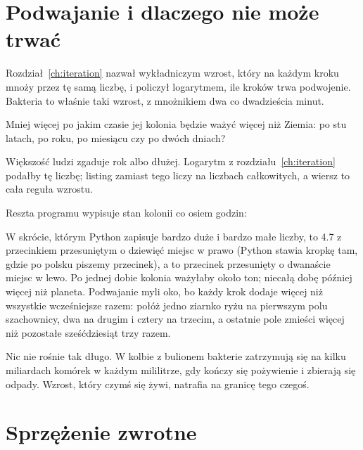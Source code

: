 \section{Podwajanie i dlaczego nie może trwać}
\label{sec:ch03-doubling}

\noindent
Rozdział~\ref{ch:iteration} nazwał wykładniczym wzrost, który na każdym
kroku mnoży przez tę samą liczbę, i policzył logarytmem, ile kroków trwa
podwojenie. Bakteria to właśnie taki wzrost, z mnożnikiem dwa co dwadzieścia
minut.

\begin{think}
Mniej więcej po jakim czasie jej kolonia będzie ważyć więcej niż Ziemia: po
stu latach, po roku, po miesiącu czy po dwóch dniach?
\end{think}
Większość ludzi zgaduje rok albo dłużej. Logarytm z
rozdziału~\ref{ch:iteration} podałby tę liczbę; listing zamiast tego liczy
na liczbach całkowitych, a wiersz  to cała reguła
wzrostu.


\noindent
Reszta programu wypisuje stan kolonii co osiem godzin:


\noindent
W skrócie, którym Python zapisuje bardzo duże i bardzo małe liczby,
 to \num{4.7} z przecinkiem przesuniętym o dziewięć miejsc w
prawo (Python stawia kropkę tam, gdzie po polsku piszemy przecinek), a
 to przecinek przesunięty o dwanaście miejsc w lewo. Po jednej
dobie kolonia ważyłaby około  ton; niecałą dobę później
więcej niż planeta. Podwajanie myli oko, bo każdy krok dodaje więcej niż
wszystkie wcześniejsze razem: połóż jedno ziarnko ryżu na pierwszym polu
szachownicy, dwa na drugim i cztery na trzecim, a ostatnie pole zmieści
więcej niż pozostałe sześćdziesiąt trzy razem.

Nic nie rośnie tak długo. W kolbie z bulionem bakterie zatrzymują się na
kilku miliardach komórek w każdym mililitrze, gdy kończy się pożywienie i
zbierają się odpady. Wzrost, który czymś się żywi, natrafia na granicę tego
czegoś.

\section{Sprzężenie zwrotne}
\label{sec:ch03-feedback}


